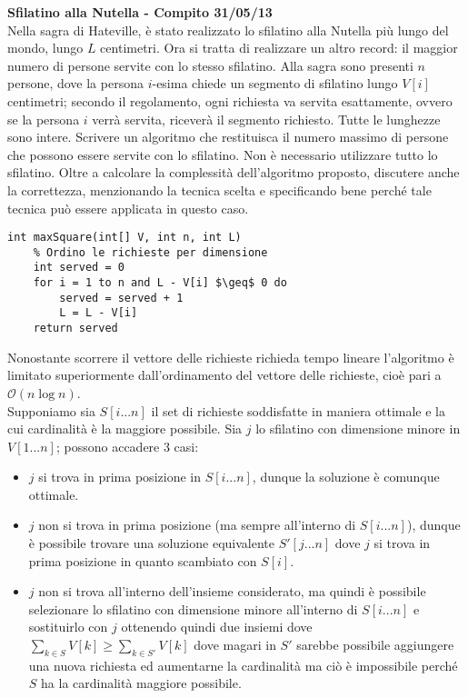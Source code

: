 \documentclass[../cheatSheetAlgoritmi.tex]{subfiles}
\begin{document}
\bigskip  
\textbf{Sfilatino alla Nutella - Compito 31/05/13}\\
Nella sagra di Hateville, è stato realizzato lo sfilatino alla Nutella più lungo del mondo, lungo $L$ centimetri. Ora si tratta di realizzare un altro record: il maggior numero di persone servite con lo stesso sfilatino. Alla sagra sono presenti $n$ persone, dove la persona $i$-esima chiede un segmento di sfilatino lungo $V[i]$ centimetri; secondo il regolamento, ogni richiesta va servita esattamente, ovvero se la persona $i$ verrà servita, riceverà il segmento richiesto. Tutte le lunghezze sono intere. Scrivere un algoritmo che restituisca il numero massimo di persone che possono essere servite con lo sfilatino. Non è necessario utilizzare tutto lo sfilatino. Oltre a calcolare la complessità dell'algoritmo proposto, discutere anche la correttezza, menzionando la tecnica scelta e specificando bene perché tale tecnica può essere applicata in questo caso.
\begin{lstlisting}[caption=Sfilatino alla Nutella]
int maxSquare(int[] V, int n, int L)
	% Ordino le richieste per dimensione
	int served = 0
	for i = 1 to n and L - V[i] $\geq$ 0 do
		served = served + 1
		L = L - V[i]
	return served
\end{lstlisting}
Nonostante scorrere il vettore delle richieste richieda tempo lineare l'algoritmo è limitato superiormente dall'ordinamento del vettore delle richieste, cioè pari a $\mathcal{O}(n \log{n})$.\\
Supponiamo sia $S[i...n]$ il set di richieste soddisfatte in maniera ottimale e la cui cardinalità è la maggiore possibile. Sia $j$ lo sfilatino con dimensione minore in $V[1...n]$; possono accadere 3 casi:
\begin{itemize}
	\item $j$ si trova in prima posizione in $S[i...n]$, dunque la soluzione è comunque ottimale.
	\item $j$ non si trova in prima posizione (ma sempre all'interno di $S[i...n]$), dunque è possibile trovare una soluzione equivalente $S'[j...n]$ dove $j$ si trova in prima posizione in quanto scambiato con $S[i]$.
	\item $j$ non si trova all'interno dell'insieme considerato, ma quindi è possibile selezionare lo sfilatino con dimensione minore all'interno di $S[i...n]$ e sostituirlo con $j$ ottenendo quindi due insiemi dove $\sum_{k \in S} V[k] \geq \sum_{k \in S'} V[k]$ dove magari in $S'$ sarebbe possibile aggiungere una nuova richiesta ed aumentarne la cardinalità ma ciò è impossibile perché $S$ ha la cardinalità maggiore possibile.
\end{itemize}
\end{document}
